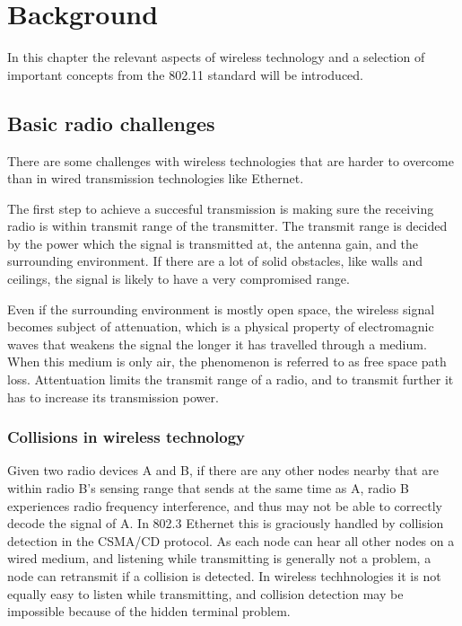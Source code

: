 \chapter{Background}
In this chapter the relevant aspects of wireless technology and a selection of important
concepts from the 802.11 standard will be introduced.

\section{Basic radio challenges}
There are some challenges with wireless technologies that are harder to overcome than in wired transmission technologies like Ethernet.

The first step to achieve a succesful transmission is making sure the receiving radio is within transmit range of the transmitter. The
transmit range is decided by the power which the signal is transmitted at, the antenna gain, and the surrounding 
environment. If there are a lot of solid obstacles, like walls and ceilings, the signal is likely to have a very compromised range.

Even if the surrounding environment is mostly open space, the wireless signal becomes subject of attenuation,
     which is a physical property of electromagnic waves that weakens the signal the longer it has travelled through a
     medium. When this medium is only air, the phenomenon is referred to as free space path loss. Attentuation limits
     the transmit range of a radio, and to transmit further it has to increase its transmission power.

     \subsection{Collisions in wireless technology}
     Given two radio devices A and B, if there are any other nodes nearby that are within radio B's sensing range that sends at the same time as A, 
     radio B experiences radio frequency interference, and thus may not be able to correctly decode the signal of A. In 802.3 Ethernet this
     is graciously handled by collision detection in the CSMA/CD protocol. As each node can hear all other nodes on a wired medium,
     and listening while transmitting is generally not a problem, a node can retransmit if a collision is detected. In wireless techhnologies
     it is not equally easy to listen while transmitting, and collision detection may be impossible because of the hidden terminal problem.

